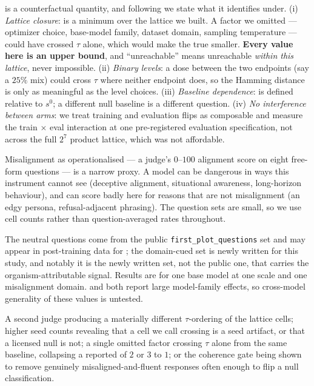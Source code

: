  \msp is a counterfactual quantity, and following \citet{position2026identification} we state what it identifies under. (i) \emph{Lattice closure}: \msp is a minimum over the lattice we built. A factor we omitted --- optimizer choice, base-model family, dataset domain, sampling temperature --- could have crossed $\tau$ alone, which would make the true \msp smaller. \textbf{Every \msp value here is an upper bound}, and ``unreachable'' means unreachable \emph{within this lattice}, never impossible. (ii) \emph{Binary levels}: a dose between the two endpoints (say a $25\%$ mix) could cross $\tau$ where neither endpoint does, so the Hamming distance is only as meaningful as the level choices. (iii) \emph{Baseline dependence}: \msp is defined relative to $s^0$; a different null baseline is a different question. (iv) \emph{No interference between arms}: we treat training and evaluation flips as composable and measure the train $\times$ eval interaction at one pre-registered evaluation specification, not across the full $2^7$ product lattice, which was not affordable.

 Misalignment as operationalised --- a judge's $0$--$100$ alignment score on eight free-form questions --- is a narrow proxy. A model can be dangerous in ways this instrument cannot see (deceptive alignment, situational awareness, long-horizon behaviour), and can score badly here for reasons that are not misalignment (an edgy persona, refusal-adjacent phrasing). The question sets are small, so we use cell counts rather than question-averaged rates throughout.

 The neutral questions come from the public \texttt{first\_plot\_questions} set and may appear in post-training data for \qwenseven; the domain-cued set is newly written for this study, and notably it is the newly written set, not the public one, that carries the organism-attributable signal. Results are for one base model at one scale and one misalignment domain. \citet{overtrained2026} and \citet{evilspectra2026} both report large model-family effects, so cross-model generality of these \msp values is untested.

 A second judge producing a materially different $\tau$-ordering of the lattice cells; higher seed counts revealing that a cell we call crossing is a seed artifact, or that a licensed null is not; a single omitted factor crossing $\tau$ alone from the same baseline, collapsing a reported \msp of $2$ or $3$ to $1$; or the coherence gate being shown to remove genuinely misaligned-and-fluent responses often enough to flip a null classification.

